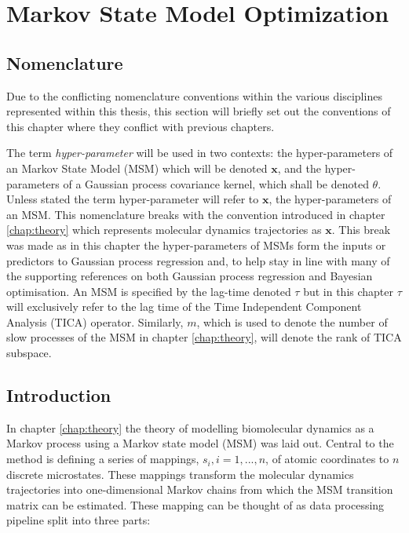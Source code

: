 \let\textcircled=\pgftextcircled
\chapter{Markov State Model Optimization}
\label{chap:msm}

\section{Nomenclature}
Due to the conflicting nomenclature conventions within the various disciplines represented within this thesis, this section will briefly set out the conventions of this chapter where they conflict with previous chapters. 

The term \emph{hyper-parameter} will be used in two contexts:  the hyper-parameters of an Markov State Model (MSM) which will be denoted $\mathbf{x}$, and the hyper-parameters of a Gaussian process covariance kernel, which shall be denoted $\theta$. Unless stated the term hyper-parameter will refer to $\mathbf{x}$, the hyper-parameters of an MSM. This nomenclature breaks with the convention introduced in chapter \ref{chap:theory} which represents molecular dynamics trajectories as $\mathbf{x}$. This break was made as in this chapter the hyper-parameters of MSMs form the inputs or predictors to Gaussian process regression and, to help stay in line with many of the supporting references on both Gaussian process regression and Bayesian optimisation. 
An MSM is specified by the lag-time denoted $\tau$ but in this chapter $\tau$ will exclusively refer to the lag time of the Time Independent Component Analysis (TICA) operator.  Similarly, $m$, which is used to denote the number of slow processes of the MSM in chapter \ref{chap:theory}, will denote the rank of TICA subspace. 

\section{Introduction}

In chapter \ref{chap:theory} the theory of modelling biomolecular dynamics as a Markov process using a Markov state model (MSM) was laid out. Central to the method is defining  a series of mappings, $s_i, i=1, ..., n$, of atomic coordinates to $n$ discrete microstates. These mappings transform the molecular dynamics trajectories into one-dimensional Markov chains from which the MSM transition matrix can be estimated. These mapping can be thought of as data processing pipeline split into three parts: 

